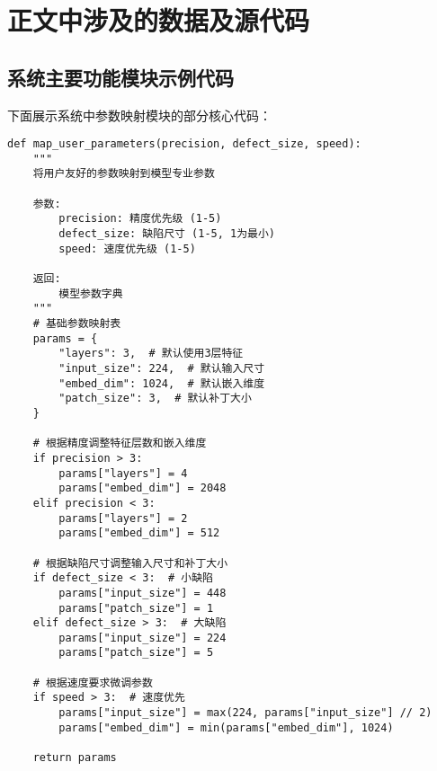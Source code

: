 \documentclass[
  ]{njuthesis}
\begin{document}


\appendix

\chapter{正文中涉及的数据及源代码}
\section{系统主要功能模块示例代码}

下面展示系统中参数映射模块的部分核心代码：

\begin{verbatim}
def map_user_parameters(precision, defect_size, speed):
    """
    将用户友好的参数映射到模型专业参数
    
    参数:
        precision: 精度优先级 (1-5)
        defect_size: 缺陷尺寸 (1-5, 1为最小)
        speed: 速度优先级 (1-5)
        
    返回:
        模型参数字典
    """
    # 基础参数映射表
    params = {
        "layers": 3,  # 默认使用3层特征
        "input_size": 224,  # 默认输入尺寸
        "embed_dim": 1024,  # 默认嵌入维度
        "patch_size": 3,  # 默认补丁大小
    }
    
    # 根据精度调整特征层数和嵌入维度
    if precision > 3:
        params["layers"] = 4
        params["embed_dim"] = 2048
    elif precision < 3:
        params["layers"] = 2
        params["embed_dim"] = 512
    
    # 根据缺陷尺寸调整输入尺寸和补丁大小
    if defect_size < 3:  # 小缺陷
        params["input_size"] = 448
        params["patch_size"] = 1
    elif defect_size > 3:  # 大缺陷
        params["input_size"] = 224
        params["patch_size"] = 5
    
    # 根据速度要求微调参数
    if speed > 3:  # 速度优先
        params["input_size"] = max(224, params["input_size"] // 2)
        params["embed_dim"] = min(params["embed_dim"], 1024)
    
    return params
\end{verbatim}

\end{document}
